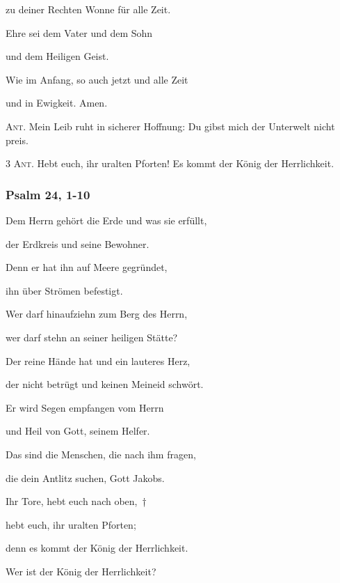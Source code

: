 zu deiner Rechten Wonne für alle Zeit.

\noindent Ehre sei dem Vater und dem Sohn~\GreStar{}~\nopagebreak

und dem Heiligen Geist.

\noindent Wie im Anfang, so auch jetzt und alle Zeit~\GreStar{}~\nopagebreak

und in Ewigkeit. Amen.

\vspace{10pt}

\noindent \textsc{Ant.} Mein Leib ruht in sicherer Hoffnung: Du gibst mich der Unterwelt nicht preis.

\vspace{10pt}

\noindent \textsc{3 Ant.} Hebt euch, ihr uralten Pforten! Es kommt der König der Herrlichkeit.

\subsubsection{Psalm 24, 1-10}

\noindent Dem Herrn gehört die Erde und was sie erfüllt,~\GreStar{}~\nopagebreak

der Erdkreis und seine Bewohner.

\noindent Denn er hat ihn auf Meere gegründet,~\GreStar{}~\nopagebreak

ihn über Strömen befestigt.

\noindent Wer darf hinaufziehn zum Berg des Herrn,~\GreStar{}~\nopagebreak

wer darf stehn an seiner heiligen Stätte?

\noindent Der reine Hände hat und ein lauteres Herz,~\GreStar{}~\nopagebreak

der nicht betrügt und keinen Meineid schwört.

\noindent Er wird Segen empfangen vom Herrn~\GreStar{}~\nopagebreak

und Heil von Gott, seinem Helfer.

\noindent Das sind die Menschen, die nach ihm fragen,~\GreStar{}~\nopagebreak

die dein Antlitz suchen, Gott Jakobs.

\noindent Ihr Tore, hebt euch nach oben,~†~\nopagebreak

hebt euch, ihr uralten Pforten;~\GreStar{}~\nopagebreak

denn es kommt der König der Herrlichkeit.

\noindent Wer ist der König der Herrlichkeit?~\GreStar{}~\nopagebreak

